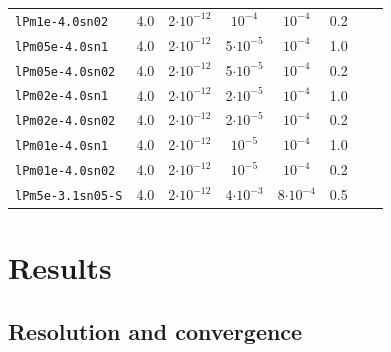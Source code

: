 \documentclass[preprint2]{aastex63}
\begin{document}
\begin{table}
\begin{tabular}{lccccccc}
\texttt{lPm1e-4.0sn02}  & 4.0 & 2$\cdot10^{-12}$    &       $10^{-4}$  &       $10^{-4}$ & 0.2  \\    
\texttt{lPm05e-4.0sn1}  & 4.0 & 2$\cdot10^{-12}$    & 5$\cdot10^{-5}$  &       $10^{-4}$ &  1.0 \\    
\texttt{lPm05e-4.0sn02} & 4.0 & 2$\cdot10^{-12}$    & 5$\cdot10^{-5}$  &       $10^{-4}$ & 0.2  \\    
\texttt{lPm02e-4.0sn1}  & 4.0 & 2$\cdot10^{-12}$    & 2$\cdot10^{-5}$  &       $10^{-4}$ &  1.0 \\    
\texttt{lPm02e-4.0sn02} & 4.0 & 2$\cdot10^{-12}$    & 2$\cdot10^{-5}$  &       $10^{-4}$ & 0.2  \\    
\texttt{lPm01e-4.0sn1}  & 4.0 & 2$\cdot10^{-12}$    &       $10^{-5}$  &       $10^{-4}$ &  1.0 \\    
\texttt{lPm01e-4.0sn02} & 4.0 & 2$\cdot10^{-12}$    &       $10^{-5}$  &       $10^{-4}$ & 0.2  \\    
\texttt{lPm5e-3.1sn05-S}& 4.0 & 2$\cdot10^{-12}$    & 4$\cdot10^{-3}$  & 8$\cdot10^{-4}$ & 0.5      
\end{tabular}
\end{table}

\section{Results} \label{sec:results}

\subsection{{Resolution and convergence}} \label{sec:conv}
\end{document}
